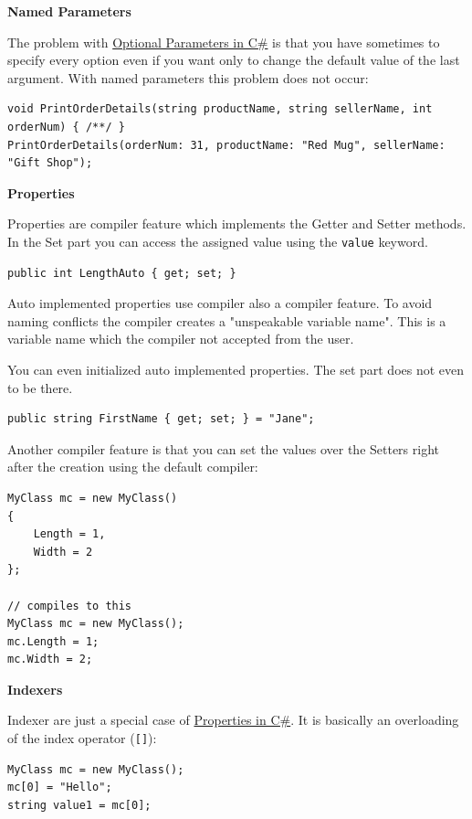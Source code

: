 \documentclass[11pt,twoside,landscape]{article}
\begin{document}
\begin{multicols}{3}
\textbf{Named Parameters}

The problem with \href{../../../roam/20211008100451-optional_parameters_in_c.org}{Optional Parameters in C\#} is that you have sometimes to specify every option even if you want only to change the default value of the last argument.
With named parameters this problem does not occur:
\lstset{language=csharp,label= ,caption= ,captionpos=b,numbers=none}
\begin{lstlisting}
void PrintOrderDetails(string productName, string sellerName, int orderNum) { /**/ }
PrintOrderDetails(orderNum: 31, productName: "Red Mug", sellerName: "Gift Shop");
\end{lstlisting}

\textbf{Properties}

Properties are compiler feature which implements the Getter and Setter methods.
In the Set part you can access the assigned value using the \texttt{value} keyword.

\lstset{language=csharp,label= ,caption= ,captionpos=b,numbers=none}
\begin{lstlisting}
public int LengthAuto { get; set; }
\end{lstlisting}

Auto implemented properties use compiler also a compiler feature.
To avoid naming conflicts the compiler creates a "unspeakable variable name".
This is a variable name which the compiler not accepted from the user.

You can even initialized auto implemented properties.
The set part does not even to be there.
\lstset{language=csharp,label= ,caption= ,captionpos=b,numbers=none}
\begin{lstlisting}
public string FirstName { get; set; } = "Jane"; 
\end{lstlisting}


Another compiler feature is that you can set the values over the Setters right after the creation using the default compiler:
\lstset{language=csharp,label= ,caption= ,captionpos=b,numbers=none}
\begin{lstlisting}
MyClass mc = new MyClass()
{
    Length = 1,
    Width = 2
};

// compiles to this
MyClass mc = new MyClass();
mc.Length = 1;
mc.Width = 2;
\end{lstlisting}

\textbf{Indexers}

Indexer are just a special case of \href{../../../roam/20211008103108-properties_in_c.org}{Properties in C\#}.
It is basically an overloading of the index operator (\texttt{[]}):
\lstset{language=csharp,label= ,caption= ,captionpos=b,numbers=none}
\begin{lstlisting}
MyClass mc = new MyClass();
mc[0] = "Hello";
string value1 = mc[0];


\end{lstlisting}
\end{multicols}
\end{document}
